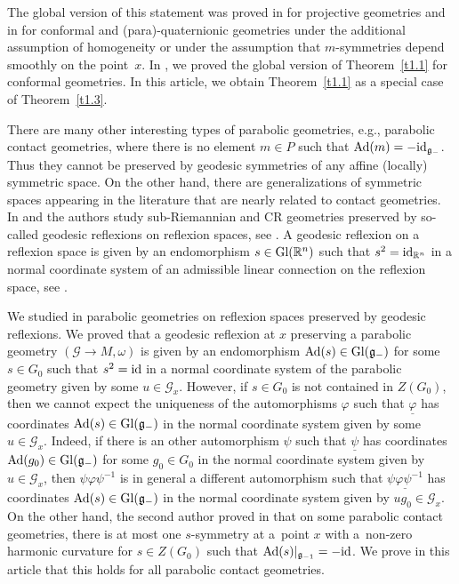 \documentclass[10pt,a4paper]{amsart}
\newcommand{\om}{\omega}
\newcommand{\un}{\underline}
\newcommand{\ba}{\mathcal{G}}
\newcommand{\fg}{\mathfrak g}
\newcommand{\Ad}{{\rm Ad}}
\newcommand{\id}{{\rm id}}
\numberwithin{equation}{section}
\begin{document}
The global version of this statement was proved in \cite{Podesta} for projective geometries and in \cite[Corollary 4.5]{LZ3} for conformal and (para)-quaternionic geometries under the additional assumption of homogeneity or under the assumption that $m$-symmetries depend smoothly on the point~$x$. In \cite[Theorem~1]{GZ4}, we proved the global version of Theorem~\ref{t1.1} for conformal geometries. In this article, we obtain Theorem~\ref{t1.1} as a special case of Theorem~\ref{t1.3}.

There are many other interesting types of parabolic geometries, e.g., parabolic contact geometries, where there is no element $m\in P$ such that $\Ad(m)=-\id_{\fg_-}$. Thus they cannot be preserved by geodesic symmetries of any af\/f\/ine (locally) symmetric space. On the other hand, there are generalizations of symmetric spaces appearing in the literature that are nearly related to contact geometries.
In \cite{BFG} and \cite{KZ} the authors study sub-Riemannian and CR geometries preserved by so-called geodesic ref\/lexions on ref\/lexion spaces, see \cite{Loos}. A geodesic ref\/lexion on a ref\/lexion space is given by an endomorphism $s\in {\rm Gl}(\mathbb{R}^n)$ such that $s^2=\id_{\mathbb{R}^n}$ in a normal coordinate system of an admissible linear connection on the ref\/lexion space, see \cite{Loos}.

We studied in \cite{disertace,GZ} parabolic geometries on ref\/lexion spaces preserved by geodesic ref\/lexions. We proved that a geodesic ref\/lexion at $x$ preserving a parabolic geometry $(\ba\to M,\om)$ is given by an endomorphism $\Ad(s)\in {\rm Gl}(\fg_-)$ for some $s\in G_0$ such that $s^2=\id$ in a normal coordinate system of the parabolic geometry given by some $u\in \ba_x$. However, if $s\in G_0$ is not contained in $Z(G_0)$, then we cannot expect the uniqueness of the automorphisms $\varphi$ such that $\un{\varphi}$ has coordinates $\Ad(s)\in {\rm Gl}(\fg_-)$ in the normal coordinate system given by some $u\in \ba_x$. Indeed, if there is an other automorphism $\psi$ such that $\un{\psi}$ has coordinates $\Ad(g_0)\in {\rm Gl}(\fg_-)$ for some $g_0\in G_0$ in the normal coordinate system given by $u\in \ba_x$, then $\psi\varphi\psi^{-1}$ is in general a dif\/ferent automorphism such that $\un{\psi\varphi\psi^{-1}}$ has coordinates $\Ad(s)\in {\rm Gl}(\fg_-)$ in the normal coordinate system given by $ug_0\in \ba_x$. On the other hand, the second author proved in \cite[Section~5]{LZ2} that on some parabolic contact geometries, there is at most one $s$-symmetry at a~point $x$ with a~non-zero harmonic curvature for $s\in Z(G_0)$ such that $\Ad(s)|_{\fg_{-1}}=-\id$. We prove in this article that this holds for all parabolic contact geometries.
\end{document}
